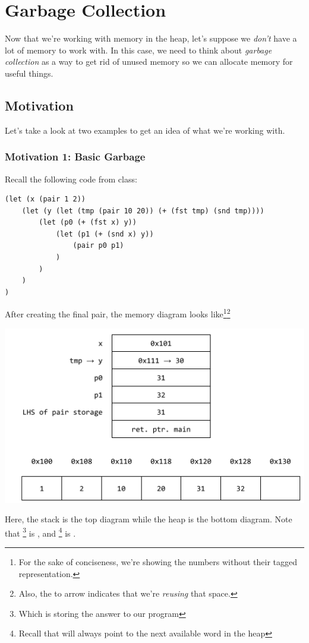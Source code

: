 \documentclass[letterpaper]{article}
\begin{document}
\section{Garbage Collection}
Now that we're working with memory in the heap, let's suppose we \emph{don't} have a lot of memory to work with. In this case, we need to think about \emph{garbage collection} as a way to get rid of unused memory so we can allocate memory for useful things. 

\subsection{Motivation}
Let's take a look at two examples to get an idea of what we're working with. 

\subsubsection{Motivation 1: Basic Garbage}
Recall the following code from class: 
\begin{verbatim}
(let (x (pair 1 2))
    (let (y (let (tmp (pair 10 20)) (+ (fst tmp) (snd tmp))))
        (let (p0 (+ (fst x) y))
            (let (p1 (+ (snd x) y))
                (pair p0 p1)
            )
        )
    )
)\end{verbatim}

After creating the final pair, the memory diagram looks like\footnote{For the sake of conciseness, we're showing the numbers without their tagged representation.}\footnote{Also, the  to  arrow indicates that we're \emph{reusing} that space.} 
\begin{center}
    \includegraphics[scale=0.6]{../assets/stackHeapPairGC1.png}
\end{center}
Here, the stack is the top diagram while the heap is the bottom diagram. Note that \footnote{Which is storing the answer to our program} is , and \footnote{Recall that  will always point to the next available word in the heap} is . 
\end{document}
